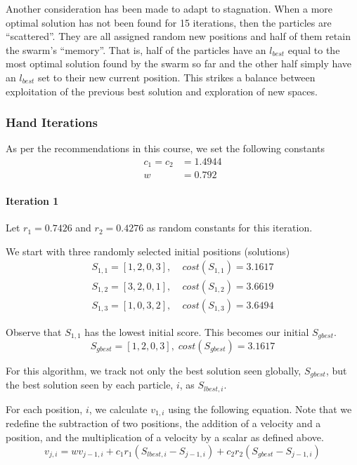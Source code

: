 \documentclass[a4paper]{article}
\newcommand{\subsubsubsection}[1]{\paragraph{#1} \mbox{}}
\begin{document}
Another consideration has been made to adapt to stagnation. When a more optimal solution has not been found for 15 iterations, then the particles are ``scattered''. They are all assigned random new positions and half of them retain the swarm's ``memory''. That is, half of the particles have an $l_\mathit{best}$ equal to the most optimal solution found by the swarm so far and the other half simply have an $l_\mathit{best}$ set to their new current position. This strikes a balance between exploitation of the previous best solution and exploration of new spaces.

\subsubsection{Hand Iterations}

As per the recommendations in this course, we set the following constants
\begin{align*}
c_1 = c_2 & = 1.4944 \\
w & = 0.792
\end{align*}

\subsubsubsection{Iteration 1}

Let $r_1 = 0.7426$ and $r_2 = 0.4276$ as random constants for this iteration.

We start with three randomly selected initial positions (solutions)
\begin{align*}
S_{1,1} = [1, 2, 0, 3], & \; cost(S_{1,1}) = 3.1617 \\
S_{1,2} = [3, 2, 0, 1], & \; cost(S_{1,2}) = 3.6619 \\
S_{1,3} = [1, 0, 3, 2], & \; cost(S_{1,3}) = 3.6494
\end{align*}

Observe that $S_{1,1}$ has the lowest initial score. This becomes our initial $S_\mathit{gbest}$.
$$S_\mathit{gbest} = [1, 2, 0, 3], \; cost(S_\mathit{gbest}) = 3.1617$$

For this algorithm, we track not only the best solution seen globally,
$S_\mathit{gbest}$, but the best solution seen by each particle, $i$, as
$S_{\mathit{lbest}, i}$.

For each position, $i$, we calculate
$v_{1,i}$ using the following equation. Note that we redefine the subtraction of
two positions, the addition of a velocity and a position, and the multiplication
of a velocity by a scalar as defined above\cite{DiscretePSO}.
$$
v_{j,i} =
  w v_{j-1, i} +
  c_1 r_1 (S_{\mathit{lbest}, i} - S_{j-1, i}) +
  c_2 r_2 (S_\mathit{gbest} - S_{j-1, i})
$$
\end{document}
